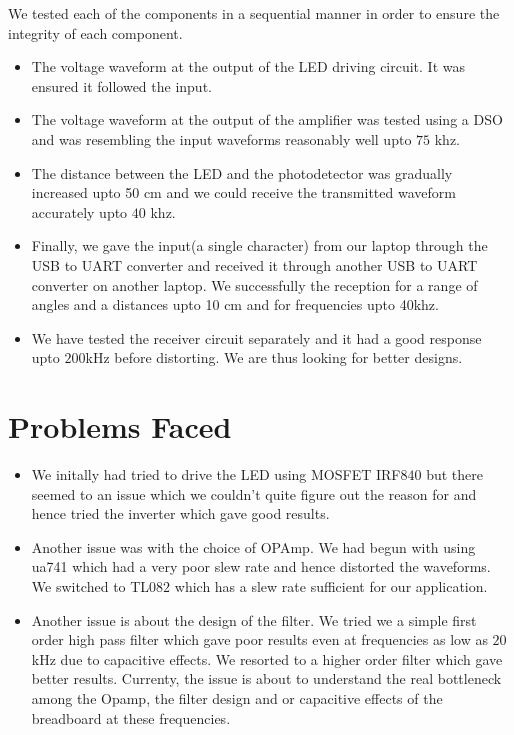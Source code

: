 \documentclass{article}
\begin{document}
We tested each of the components in a sequential manner in order to ensure the integrity of each component.
\begin{itemize}
\item The voltage waveform at the output of the LED driving circuit. It was ensured it followed the input. 
\item The voltage waveform at the output of the amplifier was tested using a DSO and was resembling the input waveforms reasonably well upto $75$ khz. 
\item The distance between the LED and the photodetector was gradually increased upto 50 cm and we could receive the transmitted waveform accurately upto $40$ khz. 
\item Finally, we gave the input(a single character) from our laptop through the USB to UART converter and received it through another USB to UART converter on another laptop. We successfully the reception for a range of angles and a distances upto 10 cm and for frequencies upto 40khz. 
\item We have tested the receiver circuit separately and it had a good response upto $200$kHz before distorting. We are thus looking for better designs.
\end{itemize}

\section{Problems Faced}

\begin{itemize}
%




\item{We initally had tried to drive the LED using MOSFET IRF$840$ but there seemed to an issue which we couldn't quite figure out the reason for and hence tried the inverter which gave good results.}
\item{Another issue was with the choice of OPAmp. We had begun with using ua741 which had a very poor slew rate and hence distorted the waveforms. We switched to TL$082$ which has a slew rate sufficient for our application.}
\item{ Another issue is about the design of the filter. We tried we a simple first order high pass filter which gave poor results even at frequencies as low as $20$kHz due to capacitive effects. We resorted to a higher order filter which gave better results. Currenty, the issue is about to understand the real bottleneck among the Opamp, the filter design and or capacitive effects of the breadboard at these frequencies.}

\end{itemize}
\end{document}
